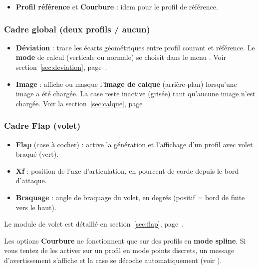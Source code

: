 \begin{itemize}
    \item \textbf{Profil référence} et \textbf{Courbure} :
        idem pour le profil de référence.
\end{itemize}

\subsubsection*{Cadre global (deux profils / aucun)}

\begin{itemize}
    \item \textbf{Déviation} : trace les écarts géométriques
        entre profil courant et référence. Le \textbf{mode} de calcul
        (verticale ou normale) se choisit dans le menu
        . Voir
        section~\ref{sec:deviation}, page~\pageref{sec:deviation}.
    \item \textbf{Image} : affiche ou masque l'\textbf{image de
        calque} (arrière-plan) lorsqu'une image a été chargée.
        La case reste inactive (grisée) tant qu'aucune image n'est
        chargée. Voir la section~\ref{sec:calque},
        page~\pageref{sec:calque}.
\end{itemize}

\subsubsection*{Cadre \og Flap \fg{} (volet)}

\begin{itemize}
    \item \textbf{Flap} (case à cocher) : active la génération et
        l'affichage d'un profil avec volet braqué (vert).
    \item \textbf{Xf} : position de l'axe d'articulation, en pourcent
        de corde depuis le bord d'attaque.
    \item \textbf{Braquage} : angle de braquage du volet, en degrés
        (positif = bord de fuite vers le haut).
\end{itemize}

Le module de volet est détaillé en section~\ref{sec:flap},
page~\pageref{sec:flap}.

\begin{important}
Les options \textbf{Courbure} ne fonctionnent que sur des
profils en \textbf{mode spline}. Si vous tentez de les activer
sur un profil en mode points discrets, un message
d'avertissement s'affiche et la case se décoche
automatiquement (voir ).
\end{important}

